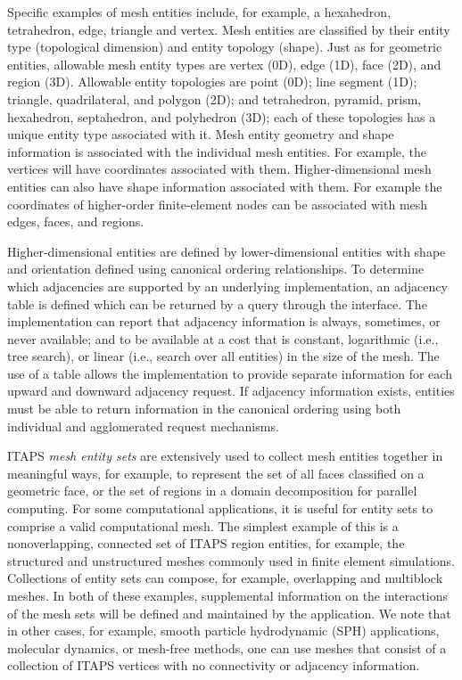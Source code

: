 Specific examples of mesh entities include, for example, a hexahedron,
tetrahedron, edge, triangle and vertex.  Mesh entities are classified
by their entity type (topological dimension) and entity topology
(shape).  Just as for geometric entities, allowable mesh entity types
are vertex (0D), edge (1D), face (2D), and region (3D).  Allowable
entity topologies are point (0D); line segment (1D); triangle,
quadrilateral, and polygon (2D); and tetrahedron, pyramid, prism,
hexahedron, septahedron, and polyhedron (3D); each of these topologies
has a unique entity type associated with it.  Mesh entity geometry and
shape information is associated with the individual mesh entities. For
example, the vertices will have coordinates associated with them.
Higher-dimensional mesh entities can also have shape information
associated with them. For example the coordinates of higher-order
finite-element nodes can be associated with mesh edges, faces, and
regions.
 
Higher-dimensional entities are defined by lower-dimensional entities
with shape and orientation defined using canonical ordering
relationships.  To determine which adjacencies are supported by an
underlying implementation, an adjacency table is defined which can be
returned by a query through the interface.  The implementation can
report that adjacency information is always, sometimes, or never
available; and to be available at a cost that is constant, logarithmic
(i.e., tree search), or linear (i.e., search over all entities) in the
size of the mesh.  The use of a table allows the implementation to
provide separate information for each upward and downward adjacency
request.  If adjacency information exists, entities must be able to
return information in the canonical ordering using both individual and
agglomerated request mechanisms.

ITAPS {\it mesh entity sets} are extensively used to collect mesh
entities together in meaningful ways, for example, to represent the
set of all faces classified on a geometric face, or the set of regions
in a domain decomposition for parallel computing.  For some
computational applications, it is useful for entity sets to comprise a
valid computational mesh.  The simplest example of this is a
nonoverlapping, connected set of ITAPS region entities, for example,
the structured and unstructured meshes commonly used in finite element
simulations.  Collections of entity sets can compose, for example,
overlapping and multiblock meshes. In both of these examples,
supplemental information on the interactions of the mesh sets will be
defined and maintained by the application.  We note that in other
cases, for example, smooth particle hydrodynamic (SPH) applications,
molecular dynamics, or mesh-free methods, one can use meshes that
consist of a collection of ITAPS vertices with no connectivity or
adjacency information.


